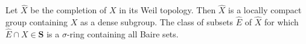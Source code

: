 Let $\hat{X}$ be the completion of $X$ in its Weil topology. Then $\hat{X}$ is a locally compact group containing $X$ as a dense subgroup. The class of subsets $\hat{E}$ of $\hat{X}$ for which $\hat{E} \cap X \in \mathbf{S}$ is a $\sigma$-ring containing all Baire sets.